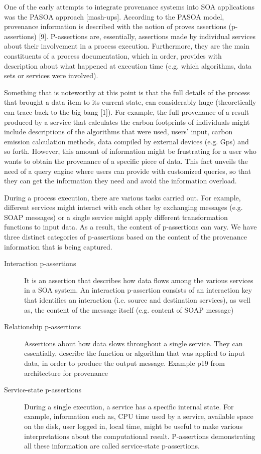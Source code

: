 One of the early attempts to integrate provenance systems into SOA applications was the PASOA approach [mash-ups]. According to the PASOA model, provenance information is described with the notion of proves assertions (p-assertions) [9]. P-assertions are, essentially, assertions made by individual services about their involvement in a process execution. Furthermore, they are the main constituents of a process documentation, which in order, provides with description about what happened at execution time (e.g. which algorithms, data sets or services were involved).

Something that is noteworthy at this point is that the full details of the process that brought a data item to its current state, can considerably huge (theoretically can trace back to the big bang [1]). For example, the full provenance of a result produced by a service that calculates the carbon footprints of individuals might include descriptions of the algorithms that were used, users' input, carbon emission calculation methods, data compiled by external devices (e.g. Gps) and so forth. However, this amount of information might be frustrating for a user who wants to obtain the provenance of a specific piece of data. This fact unveils the need of a query engine where users can provide with customized queries, so that they can get the information they need and avoid the information overload.

During a process execution, there are various tasks carried out. For example, different services might interact with each other by exchanging messages (e.g. SOAP messages) or a single service might apply different transformation functions to input data. As a result, the content of p-assertions can vary. We have three distinct categories of p-assertions based on the content of the provenance information that is being captured.

\begin{description}
  \item[Interaction p-assertions]
         It is an assertion that describes how data flows among the various services in a SOA system. An interaction p-assertion consists of an interaction key that identifies an interaction (i.e. source and destination services), as well as, the content of the message itself (e.g. content of SOAP message)
  \item[ Relationship p-assertions] 
      Assertions about how data slows throughout a single service. They can essentially, describe the function or algorithm that was applied to input data, in order to produce the output message.
       Example p19 from architecture for provenance

  \item[Service-state p-assertions]
        During a single execution, a service has a specific internal state. For example, information such as, CPU time used by a service, available space on the disk, user logged in, local time, might be useful to make various interpretations about the computational result.  P-assertions demonstrating all these information are called service-state p-assertions.
\end{description}

